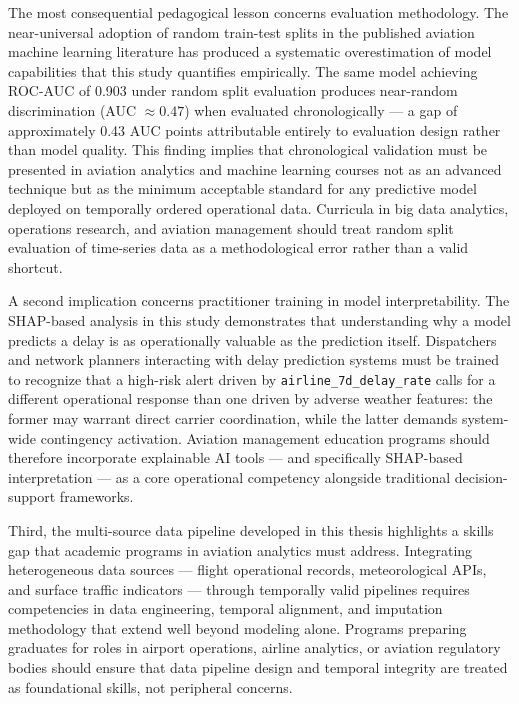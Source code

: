 \documentclass{report}
\begin{document}
The most consequential pedagogical lesson concerns evaluation methodology. The near-universal
adoption of random train-test splits in the published aviation machine learning literature has
produced a systematic overestimation of model capabilities that this study quantifies
empirically. The same model achieving ROC-AUC of 0.903 under random split evaluation produces
near-random discrimination (AUC $\approx 0.47$) when evaluated chronologically --- a gap of
approximately 0.43 AUC points attributable entirely to evaluation design rather than model
quality. This finding implies that chronological validation must be presented in aviation
analytics and machine learning courses not as an advanced technique but as the minimum
acceptable standard for any predictive model deployed on temporally ordered operational data.
Curricula in big data analytics, operations research, and aviation management should treat
random split evaluation of time-series data as a methodological error rather than a valid
shortcut.

A second implication concerns practitioner training in model interpretability. The SHAP-based
analysis in this study demonstrates that understanding why a model predicts a delay is as
operationally valuable as the prediction itself. Dispatchers and network planners interacting
with delay prediction systems must be trained to recognize that a high-risk alert driven by
\texttt{airline\_7d\_delay\_rate} calls for a different operational response than one driven
by adverse weather features: the former may warrant direct carrier coordination, while the
latter demands system-wide contingency activation. Aviation management education programs
should therefore incorporate explainable AI tools --- and specifically SHAP-based
interpretation --- as a core operational competency alongside traditional decision-support
frameworks.

Third, the multi-source data pipeline developed in this thesis highlights a skills gap that
academic programs in aviation analytics must address. Integrating heterogeneous data
sources --- flight operational records, meteorological APIs, and surface traffic indicators
--- through temporally valid pipelines requires competencies in data engineering, temporal
alignment, and imputation methodology that extend well beyond modeling alone. Programs
preparing graduates for roles in airport operations, airline analytics, or aviation regulatory
bodies should ensure that data pipeline design and temporal integrity are treated as
foundational skills, not peripheral concerns.
\end{document}
